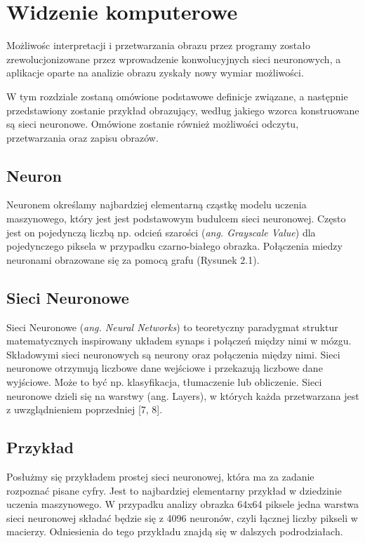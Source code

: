 \documentclass[brudnopis]{xmgr}
\begin{document}
	


\chapter{Widzenie komputerowe  }

Możliwośc interpretacji i przetwarzania obrazu przez programy zostało zrewolucjonizowane
przez wprowadzenie konwolucyjnych sieci neuronowych, a aplikacje oparte na analizie obrazu zyskały nowy wymiar możliwości. 

W tym rozdziale zostaną omówione podstawowe definicje związane, a następnie przedstawiony zostanie przykład obrazujący, według jakiego wzorca konstruowane są sieci neuronowe. Omówione zostanie również 
możliwości odczytu, przetwarzania oraz zapisu obrazów.

\section{Neuron  \label{s:dsssl}}

Neuronem określamy najbardziej elementarną cząstkę modelu uczenia maszynowego, który jest jest podstawowym budulcem sieci neuronowej. Często jest on pojedynczą liczbą np. odcień szarości (\textit{ang. Grayscale Value}) dla pojedynczego piksela w przypadku czarno-białego obrazka. Połączenia miedzy neuronami obrazowane się za pomocą grafu (Rysunek 2.1).

\section{Sieci Neuronowe   \label{s:dsssl}}

Sieci Neuronowe (\textit{ang. Neural Networks}) to teoretyczny paradygmat struktur matematycznych inspirowany układem synaps i połączeń między nimi w mózgu. Składowymi sieci neuronowych są neurony oraz połączenia między nimi. Sieci neuronowe otrzymują liczbowe dane wejściowe i przekazują liczbowe dane wyjściowe. Może to być np. klasyfikacja, tłumaczenie lub obliczenie. Sieci neuronowe dzieli się na warstwy (ang. Layers), w których każda przetwarzana jest z uwzglądnieniem poprzedniej [7, 8].



\section{Przykład  \label{s:dsssl}}

Posłużmy się przykładem prostej sieci neuronowej, która ma za zadanie rozpoznać pisane cyfry. Jest to najbardziej elementarny przykład w dziedzinie uczenia maszynowego.
W przypadku analizy obrazka 64x64 piksele jedna warstwa sieci neuronowej składać będzie się z 4096 neuronów, czyli łącznej liczby pikseli w macierzy. Odniesienia do tego przykładu znajdą się w dalszych podrodziałach.
\end{document}
